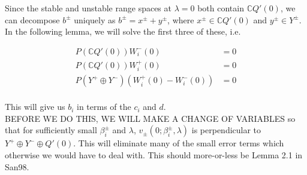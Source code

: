 \documentclass[12pt]{article}
\def\C{{\mathbb C}}
\begin{document}
Since the stable and unstable range spaces at $\lambda = 0$ both contain $\C Q'(0)$, we can decompose $b^\pm$ uniquely as $b^\pm = x^\pm + y^\pm$, where $x^\pm \in \C Q'(0)$ and $y^\pm \in Y^\pm$.\\

In the following lemma, we will solve the first three of these, i.e. 

\begin{align*}
P(\C Q'(0))W_i^-(0) &= 0 \\
P(\C Q'(0))W_i^+(0) &= 0 \\
P(Y^+ \oplus Y^-) ( W_i^+(0) - W_i^-(0) ) &= 0 \\
\end{align*}

This will give us $b_i$ in terms of the $c_i$ and $d$.\\

BEFORE WE DO THIS, WE WILL MAKE A CHANGE OF VARIABLES so that for sufficiently small $\beta_i^\pm$ and $\lambda$, $v_\pm(0; \beta_i^\pm, \lambda)$ is perpendicular to $Y^+ \oplus Y^- \oplus Q'(0)$. This will eliminate many of the small error terms which otherwise we would have to deal with. This should more-or-less be Lemma 2.1 in San98.\\

\end{document}
